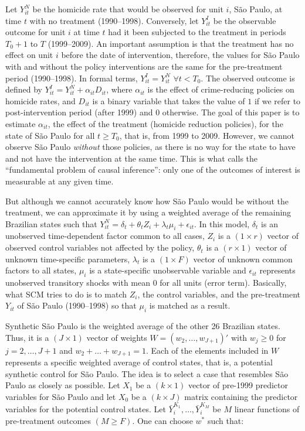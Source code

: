 Let $Y_{it}^N$ be the homicide rate that would be observed for unit $i$, São Paulo, at time $t$ with no treatment (1990--1998). Conversely, let $Y_{it}^I$ be the observable outcome for unit $i$ at time $t$ had it been subjected to the treatment in periods $T_{0} + 1$ to $T$ (1999--2009). An important assumption is that the treatment has no effect on unit $i$ before the date of intervention, therefore, the values for São Paulo with and without the policy interventions are the same for the pre-treatment period (1990--1998). In formal terms, $Y_{it}^I = Y_{it}^N$ $\forall t < T_{0}$. The observed outcome is defined by $Y_{it}^I = Y_{it}^N + \alpha_{it}D_{it}$, where $\alpha_{it}$ is the effect of crime-reducing policies on homicide rates, and $D_{it}$ is a binary variable that takes the value of $1$ if we refer to post-intervention period (after 1999) and $0$ otherwise. The goal of this paper is to estimate $\alpha_{it}$, the effect of the treatment (homicide reduction policies), for the state of São Paulo for all $t \geq T_0$, that is, from 1999 to 2009. However, we cannot observe São Paulo \emph{without} those policies, as there is no way for the state to have and not have the intervention at the same time. This is what \citet{holland1986} calls the ``fundamental problem of causal inference'': only one of the outcomes of interest is measurable at any given time.

But although we cannot accurately know how São Paulo would be without the treatment, we can approximate it by using a weighted average of the remaining Brazilian states such that $Y_{it}^N = \delta_{t} + \theta_{t}Z_{i} + \lambda_{t}\mu_{i} + \epsilon_{it}$. In this model, $\delta_{t}$ is an unobserved time-dependent factor common to all cases, $Z_{i}$ is a $(1 \times r)$ vector of observed control variables not affected by the policy, $\theta_{t}$ is a $(r \times 1)$ vector of unknown time-specific parameters, $\lambda_{t}$ is a $(1 \times F)$ vector of unknown common factors to all states, $\mu_{i}$ is a state-specific unobservable variable and $\epsilon_{it}$ represents unobserved transitory shocks with mean $0$ for all units (error term). Basically, what SCM tries to do is to match $Z_{i}$, the control variables, and the pre-treatment $Y_{it}$ of São Paulo (1990--1998) so that $\mu_{i}$ is matched as a result.

Synthetic São Paulo is the weighted average of the other 26 Brazilian states. Thus, it is a $(J \times 1)$ vector of weights $W = (w_2 , \dots, w_{J+1})'$ with $w_j \geq 0$ for $j = 2, \dots, J + 1$ and $w_2 + \dots + w_{J+1} = 1$. Each of the elements included in $W$ represents a specific weighted average of control states, that is, a potential synthetic control for São Paulo. The idea is to select a case that resembles São Paulo as closely as possible. Let $X_{1}$ be a $(k \times 1)$ vector of pre-1999 predictor variables for São Paulo and let $X_{0}$ be a $(k \times J)$ matrix containing the predictor variables for the potential control states. Let $\bar{Y}_{i}^{K_{1}}, \dots, \bar{Y}_{i}^{K_{M}}$ be $M$ linear functions of pre-treatment outcomes $(M \geq F)$. One can choose $w^*$ such that:

